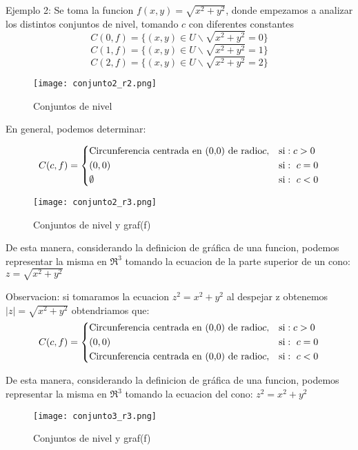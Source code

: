 \begin{definition} 
 

Ejemplo 2: Se toma la funcion $f(x,y)=\sqrt{x^2+y^2}$, donde empezamos a analizar los distintos conjuntos de nivel, tomando $c$ con diferentes constantes
 \[
C(0,f)=\{(x,y) \in U \backslash \sqrt{x^2+y^2}=0 \}
\]
 \[
C(1,f)=\{(x,y) \in U \backslash \sqrt{x^2+y^2}=1 \}
\]
 \[
C(2,f)=\{(x,y) \in U \backslash \sqrt{x^2+y^2}=2 \}
 \]

\begin{figure}[h!] %
    \centering
    \texttt{[image: conjunto2\_r2.png]} %
    \caption{Conjuntos de nivel}
    \label{fig:ejemplo} %
\end{figure}

En general, podemos determinar: 

   \[
        C(c,f)=
        \begin{dcases}
           \textnormal{Circunferencia centrada en (0,0) de radio} c,  & \textnormal{si}:  c>0 \\
(0,0)  & \textnormal{si}:\ c=0\\
\emptyset  & \textnormal{si}:\ c<0\\
        \end{dcases}
    \]
\begin{figure}[h!] %
    \centering
    \texttt{[image: conjunto2\_r3.png]} %
    \caption{Conjuntos de nivel y graf(f)}
    \label{fig:ejemplo} %
\end{figure}

De esta manera, considerando la definicion de gráfica de una funcion, podemos representar la misma en $\Re^3$ tomando  la ecuacion de la parte superior de un cono: $z=\sqrt{x^2+y^2}$


Observacion: si tomaramos la ecuacion $z^2=x^2+y^2$ al despejar z obtenemos $|z|=\sqrt{x^2+y^2}$ obtendriamos que: 
 \[
        C(c,f)=
        \begin{dcases}
           \textnormal{Circunferencia centrada en (0,0) de radio} c,  & \textnormal{si}:  c>0 \\
(0,0)  & \textnormal{si}:\ c=0\\
\textnormal{Circunferencia centrada en (0,0) de radio} c,  & \textnormal{si}:\ c<0\\
        \end{dcases}
    \]

De esta manera, considerando la definicion de gráfica de una funcion, podemos representar la misma en $\Re^3$ tomando  la ecuacion del cono: $z^2=x^2+y^2$

\begin{figure}[h!] %
    \centering
    \texttt{[image: conjunto3\_r3.png]} %
    \caption{Conjuntos de nivel y graf(f)}
    \label{fig:ejemplo} %
\end{figure}


\end{definition}
